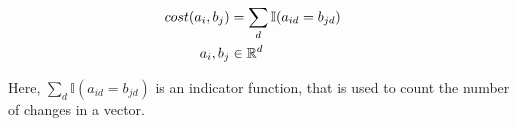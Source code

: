 \documentclass[./../../paper.tex]{subfiles}
\begin{document}
\begin{align}
    \label{eq:sparcity}                           \\
    cost(a_i, b_j)      & = \sum_d \mathbb{I}(a_{id} = b_{jd}) \\
    a_i,b_j        & \in \mathbb{R}^d
\end{align}

\noindent Here, $\sum_d \mathbb{I}(a_{id} = b_{jd})$ is an indicator function, that is used to count the number of changes in a vector.




\end{document}
